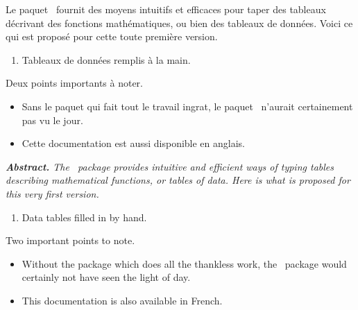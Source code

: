 \documentclass[10pt, a4paper]{article}
\begin{document}
\noindent
Le paquet \thispack\ fournit des moyens intuitifs et efficaces pour taper des tableaux décrivant des fonctions mathématiques, ou bien des tableaux de données.
Voici ce qui est proposé pour cette toute première version.
\begin{enumerate}
	\item Tableaux de données remplis à la main.%

%
%
\end{enumerate}

\medskip

\noindent
Deux points importants à noter.
\begin{itemize}
    \item Sans le paquet  qui fait tout le travail ingrat, le paquet \thispack\ n'aurait certainement pas vu le jour.

    \item Cette documentation est aussi disponible en anglais.
\end{itemize}




\tdocsep

{\noindent
\small\itshape
\textbf{Abstract.}
The \thispack\ package provides intuitive and efficient ways of typing tables describing mathematical functions, or tables of data. %
Here is what is proposed for this very first version.
\begin{enumerate}
	\item Data tables filled in by hand.%

%
%
\end{enumerate}

\medskip

\noindent
Two important points to note.
\begin{itemize}
    \item Without the  package which does all the thankless work, the \thispack\ package would certainly not have seen the light of day.

    \item This documentation is also available in French.
\end{itemize}
}
\end{document}
